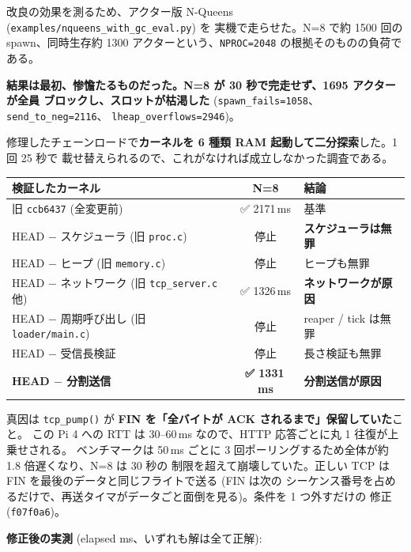 \documentclass[a4paper,11pt]{ltjsarticle}
\begin{document}
改良の効果を測るため、アクター版 N-Queens (\texttt{examples/nqueens\_with\_gc\_eval.py}) を
実機で走らせた。N=8 で約 1500 回の spawn、同時生存約 1300 アクターという、\texttt{NPROC=2048}
の根拠そのものの負荷である。

\textbf{結果は最初、惨憺たるものだった。N=8 が 30 秒で完走せず、1695 アクターが全員
ブロックし、スロットが枯渇した} (\texttt{spawn\_fails=1058}、\texttt{send\_to\_neg=2116}、
\texttt{lheap\_overflows=2946})。

修理したチェーンロードで\textbf{カーネルを 6 種類 RAM 起動して二分探索}した。1 回 25 秒で
載せ替えられるので、これがなければ成立しなかった調査である。

\begin{center}\small
\begin{tabular}{@{}p{7.4cm} c p{5.0cm}@{}}
\toprule
\textbf{検証したカーネル} & \textbf{N=8} & \textbf{結論}\\ \midrule
旧 \texttt{ccb6437} (全変更前)                      & ✅ 2171\,ms & 基準\\
HEAD $-$ スケジューラ (旧 \texttt{proc.c})          & 停止        & \textbf{スケジューラは無罪}\\
HEAD $-$ ヒープ (旧 \texttt{memory.c})              & 停止        & ヒープも無罪\\
HEAD $-$ ネットワーク (旧 \texttt{tcp\_server.c} 他)& ✅ 1326\,ms & \textbf{ネットワークが原因}\\
HEAD $-$ 周期呼び出し (旧 \texttt{loader/main.c})   & 停止        & reaper / tick は無罪\\
HEAD $-$ 受信長検証                                 & 停止        & 長さ検証も無罪\\
\textbf{HEAD $-$ 分割送信}                          & \textbf{✅ 1331\,ms} & \textbf{分割送信が原因}\\
\bottomrule
\end{tabular}
\end{center}

真因は \texttt{tcp\_pump()} が\textbf{ FIN を「全バイトが ACK されるまで」保留していた}こと。
この Pi 4 への RTT は 30--60\,ms なので、HTTP 応答ごとに丸 1 往復が上乗せされる。
ベンチマークは 50\,ms ごとに 3 回ポーリングするため全体が約 1.8 倍遅くなり、N=8 は 30 秒の
制限を超えて崩壊していた。正しい TCP は FIN を最後のデータと同じフライトで送る (FIN は次の
シーケンス番号を占めるだけで、再送タイマがデータごと面倒を見る)。条件を 1 つ外すだけの
修正 (\texttt{f07f0a6})。

\textbf{修正後の実測} (elapsed ms、いずれも解は全て正解):
\end{document}
